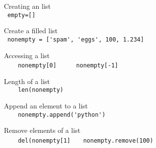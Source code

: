 Creating an list\\
{\ex \lstinline| empty=[]|}

Create a filled list\\
{\ex \lstinline| nonempty = ['spam', 'eggs', 100, 1.234]  |}

Accessing a list\\
{\ex \lstinline|    nonempty[0] |}
{\ex \lstinline|    nonempty[-1] |}

Length of a list\\
{\ex \lstinline|    len(nonempty) |}

Append an element to a list\\
{\ex \lstinline|    nonempty.append('python') |}

Remove elements of a list\\
{\ex \lstinline|    del(nonempty[1] |}
{\ex \lstinline|  nonempty.remove(100) |}
